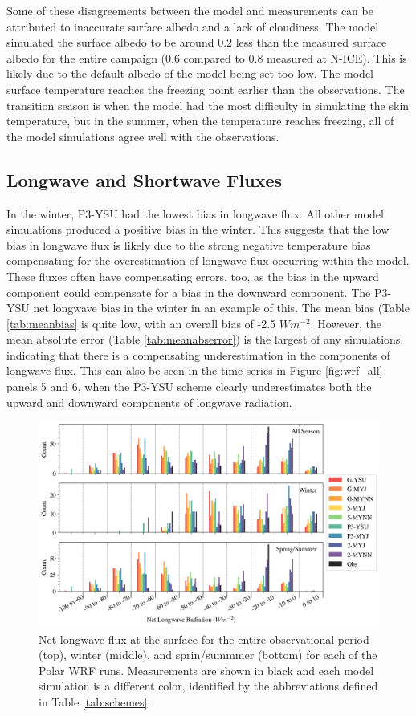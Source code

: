 Some of these disagreements between the model and measurements can be attributed to inaccurate surface albedo and a lack of cloudiness. The model simulated the surface albedo to be around 0.2 less than the measured surface albedo for the entire campaign (0.6 compared to 0.8 measured at N-ICE). This is likely due to the default albedo of the model being set too low. The model surface temperature reaches the freezing point earlier than the observations. The transition season is when the model had the most difficulty in simulating the skin temperature, but in the summer, when the temperature reaches freezing, all of the model simulations agree well with the observations. 

\subsection{Longwave and Shortwave Fluxes}
In the winter, P3-YSU had the lowest bias in longwave flux. All other model simulations produced a positive bias in the winter. This suggests that the low bias in longwave flux is likely due to the strong negative temperature bias compensating for the overestimation of longwave flux occurring within the model. These fluxes often have compensating errors, too, as the bias in the upward component could compensate for a bias in the downward component. The P3-YSU net longwave bias in the winter in an example of this. The mean bias (Table \ref{tab:meanbias} is quite low, with an overall bias of -2.5 $Wm^{-2}$. However, the mean absolute error (Table \ref{tab:meanabserror}) is the largest of any simulations, indicating that there is a compensating underestimation in the components of longwave flux. This can also be seen in the time series in Figure \ref{fig:wrf_all} panels 5 and 6, when the P3-YSU scheme clearly underestimates both the upward and downward components of longwave radiation. 

  \begin{figure}[t]
    \centering
    \includegraphics[width=1\linewidth]{figures/chapter3/WRF_NetLW_Histo.png}
    \caption[Polar WRF simulated net longwave flux histograms.]{Net longwave flux at the surface for the entire observational period (top), winter (middle), and sprin/summmer (bottom) for each of the Polar WRF runs. Measurements are shown in black and each model simulation is a different color, identified by the abbreviations defined in Table \ref{tab:schemes}.}
    \label{fig:wrf_netlw}
\end{figure}

